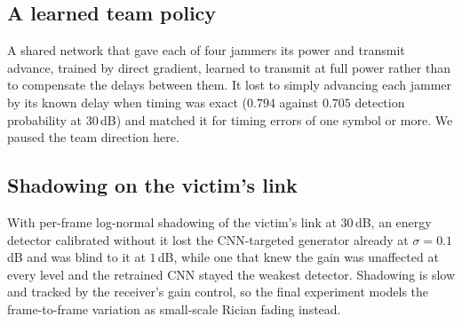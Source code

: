 %

\subsection{A learned team policy}
A shared network that gave each of four jammers its power and transmit advance, trained by direct gradient, learned to transmit at full power rather than to compensate the delays between them.
It lost to simply advancing each jammer by its known delay when timing was exact ($0.794$ against $0.705$ detection probability at $30$\,dB) and matched it for timing errors of one symbol or more.
We paused the team direction here.

\subsection{Shadowing on the victim's link}
With per-frame log-normal shadowing of the victim's link at $30$\,dB, an energy detector calibrated without it lost the CNN-targeted generator already at $\sigma=0.1$\,dB and was blind to it at $1$\,dB, while one that knew the gain was unaffected at every level and the retrained CNN stayed the weakest detector.
Shadowing is slow and tracked by the receiver's gain control, so the final experiment models the frame-to-frame variation as small-scale Rician fading instead.


